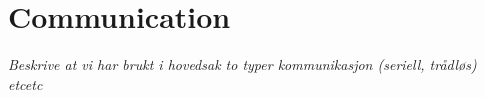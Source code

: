 \section{Communication}
\label{sec:tCommunication}
\textit{Beskrive at vi har brukt i hovedsak to typer kommunikasjon (seriell, trådløs) etcetc}


%